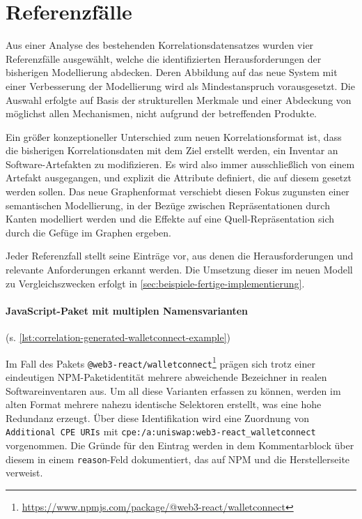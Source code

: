 \section{Referenzfälle}\label{sec:reference-case-chapter}

Aus einer Analyse des bestehenden Korrelationsdatensatzes wurden vier Referenzfälle ausgewählt, welche die identifizierten Herausforderungen der bisherigen Modellierung abdecken.
Deren Abbildung auf das neue System mit einer Verbesserung der Modellierung wird als Mindestanspruch vorausgesetzt.
Die Auswahl erfolgte auf Basis der strukturellen Merkmale und einer Abdeckung von möglichst allen Mechanismen, nicht aufgrund der betreffenden Produkte.

Ein größer konzeptioneller Unterschied zum neuen Korrelationsformat ist, dass die bisherigen Korrelationsdaten mit dem Ziel erstellt werden, ein Inventar an Software-Artefakten zu modifizieren.
Es wird also immer ausschließlich von einem Artefakt ausgegangen, und explizit die Attribute definiert, die auf diesem gesetzt werden sollen.
Das neue Graphenformat verschiebt diesen Fokus zugunsten einer semantischen Modellierung, in der Bezüge zwischen Repräsentationen durch Kanten modelliert werden und die Effekte auf eine Quell-Repräsentation sich durch die Gefüge im Graphen ergeben.

Jeder Referenzfall stellt seine Einträge vor, aus denen die Herausforderungen und relevante Anforderungen erkannt werden.
Die Umsetzung dieser im neuen Modell zu Vergleichszwecken erfolgt in \autoref{sec:beispiele-fertige-implementierung}.


\paragraph{JavaScript-Paket mit multiplen Namensvarianten}\label{par:reference-case-walletconnect} (s. \autoref{lst:correlation-generated-walletconnect-example})

Im Fall des Pakets \texttt{@web3-react/walletconnect}\footnote{\url{https://www.npmjs.com/package/@web3-react/walletconnect}} prägen sich trotz einer eindeutigen NPM-Paketidentität mehrere abweichende Bezeichner in realen Softwareinventaren aus.
Um all diese Varianten erfassen zu können, werden im alten Format mehrere nahezu identische Selektoren erstellt, was eine hohe Redundanz erzeugt.
Über diese Identifikation wird eine Zuordnung von \texttt{Additional CPE URIs} mit \texttt{cpe:/a:uniswap:web3-react\_walletconnect} vorgenommen.
Die Gründe für den Eintrag werden in dem Kommentarblock über diesem in einem \texttt{reason}-Feld dokumentiert, das auf NPM und die Herstellerseite verweist.

